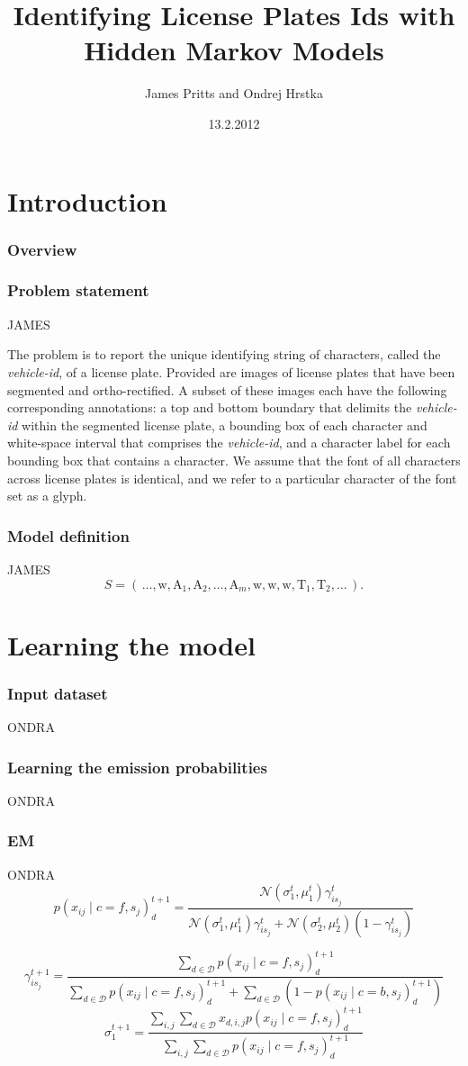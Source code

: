 \documentclass{beamer}
\title{Identifying License Plates Ids with Hidden Markov
    Models}
\author{ James Pritts and Ondrej Hrstka }
\institute[CTU FEE]{Czech technical university - Faculty of Electrical Engineering}
\date{13.2.2012}
\begin{document}
\begin{frame}
  \titlepage
\end{frame}
\section{Introduction}
\begin{frame}
  \frametitle{Overview}
  \tableofcontents[currentsection]
\end{frame}

\begin{frame}
  \frametitle{Problem statement}
JAMES  
  
  The problem is to report the unique identifying string of characters,
called the \emph{vehicle-id}, of a license plate.  Provided are images
of license plates that have been segmented and ortho-rectified. A
subset of these images each have the following corresponding
annotations: a top and bottom boundary that delimits the
\emph{vehicle-id} within the segmented license plate, a bounding box
of each character and white-space interval that comprises the
\emph{vehicle-id}, and a character label for each bounding box that
contains a character.  We assume that the font of all characters
across license plates is identical, and we refer to a particular
character of the font set as a glyph.

\end{frame}

\begin{frame}
  \frametitle{Model definition}
  JAMES
\[S =
\left(\,\dots,\text{w},\text{A}_1,\text{A}_2,\ldots,\text{A}_{m},\text{w},\text{w},\text{w},\text{T}_1,\text{T}_2,\ldots\,\right).\]
\end{frame}

\section{Learning the model}

\begin{frame}
  \frametitle{Input dataset}
ONDRA
\end{frame}

\begin{frame}
  \frametitle{Learning the emission probabilities}
  ONDRA
\end{frame}

\begin{frame}
  \frametitle{EM}
ONDRA
\[
  p(x_{ij} \mid c=f, s_j)_d^{t+1} = \frac{\mathcal{N}(\sigma_1^t,\mu_1^t)\gamma_{is_j}^t}{\mathcal{N}(\sigma_1^t,\mu_1^t)\gamma_{is_j}^t+\mathcal{N}(\sigma_2^t,\mu_2^t)(1-\gamma_{is_j}^t)}
\]

\[
  \gamma_{is_j}^{t+1} = \frac{\sum_{d \in \mathcal{D}} p(x_{ij} \mid c=f, s_j)_d^{t+1}}{\sum_{d \in \mathcal{D}} p(x_{ij} \mid c=f, s_j)_d^{t+1} + \sum_{d \in \mathcal{D}} (1-p(x_{ij} \mid c=b, s_j)_d^{t+1})}
\]
\[
  \sigma_1^{t+1} = \frac{\sum_{i,j} \sum_{d \in \mathcal{D}} x_{d, i,j} p(x_{ij} \mid c=f, s_j)_d^{t+1} }{\sum_{i,j} \sum_{d \in \mathcal{D}} p(x_{ij} \mid c=f, s_j)_d^{t+1}}
\]  
  
\end{frame}
\end{document}
